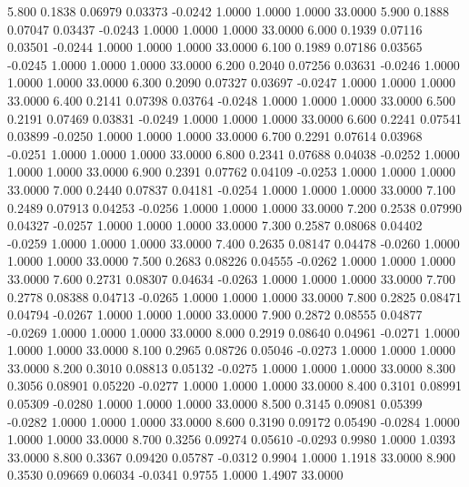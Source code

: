    5.800   0.1838   0.06979   0.03373  -0.0242   1.0000   1.0000   1.0000  33.0000
   5.900   0.1888   0.07047   0.03437  -0.0243   1.0000   1.0000   1.0000  33.0000
   6.000   0.1939   0.07116   0.03501  -0.0244   1.0000   1.0000   1.0000  33.0000
   6.100   0.1989   0.07186   0.03565  -0.0245   1.0000   1.0000   1.0000  33.0000
   6.200   0.2040   0.07256   0.03631  -0.0246   1.0000   1.0000   1.0000  33.0000
   6.300   0.2090   0.07327   0.03697  -0.0247   1.0000   1.0000   1.0000  33.0000
   6.400   0.2141   0.07398   0.03764  -0.0248   1.0000   1.0000   1.0000  33.0000
   6.500   0.2191   0.07469   0.03831  -0.0249   1.0000   1.0000   1.0000  33.0000
   6.600   0.2241   0.07541   0.03899  -0.0250   1.0000   1.0000   1.0000  33.0000
   6.700   0.2291   0.07614   0.03968  -0.0251   1.0000   1.0000   1.0000  33.0000
   6.800   0.2341   0.07688   0.04038  -0.0252   1.0000   1.0000   1.0000  33.0000
   6.900   0.2391   0.07762   0.04109  -0.0253   1.0000   1.0000   1.0000  33.0000
   7.000   0.2440   0.07837   0.04181  -0.0254   1.0000   1.0000   1.0000  33.0000
   7.100   0.2489   0.07913   0.04253  -0.0256   1.0000   1.0000   1.0000  33.0000
   7.200   0.2538   0.07990   0.04327  -0.0257   1.0000   1.0000   1.0000  33.0000
   7.300   0.2587   0.08068   0.04402  -0.0259   1.0000   1.0000   1.0000  33.0000
   7.400   0.2635   0.08147   0.04478  -0.0260   1.0000   1.0000   1.0000  33.0000
   7.500   0.2683   0.08226   0.04555  -0.0262   1.0000   1.0000   1.0000  33.0000
   7.600   0.2731   0.08307   0.04634  -0.0263   1.0000   1.0000   1.0000  33.0000
   7.700   0.2778   0.08388   0.04713  -0.0265   1.0000   1.0000   1.0000  33.0000
   7.800   0.2825   0.08471   0.04794  -0.0267   1.0000   1.0000   1.0000  33.0000
   7.900   0.2872   0.08555   0.04877  -0.0269   1.0000   1.0000   1.0000  33.0000
   8.000   0.2919   0.08640   0.04961  -0.0271   1.0000   1.0000   1.0000  33.0000
   8.100   0.2965   0.08726   0.05046  -0.0273   1.0000   1.0000   1.0000  33.0000
   8.200   0.3010   0.08813   0.05132  -0.0275   1.0000   1.0000   1.0000  33.0000
   8.300   0.3056   0.08901   0.05220  -0.0277   1.0000   1.0000   1.0000  33.0000
   8.400   0.3101   0.08991   0.05309  -0.0280   1.0000   1.0000   1.0000  33.0000
   8.500   0.3145   0.09081   0.05399  -0.0282   1.0000   1.0000   1.0000  33.0000
   8.600   0.3190   0.09172   0.05490  -0.0284   1.0000   1.0000   1.0000  33.0000
   8.700   0.3256   0.09274   0.05610  -0.0293   0.9980   1.0000   1.0393  33.0000
   8.800   0.3367   0.09420   0.05787  -0.0312   0.9904   1.0000   1.1918  33.0000
   8.900   0.3530   0.09669   0.06034  -0.0341   0.9755   1.0000   1.4907  33.0000
